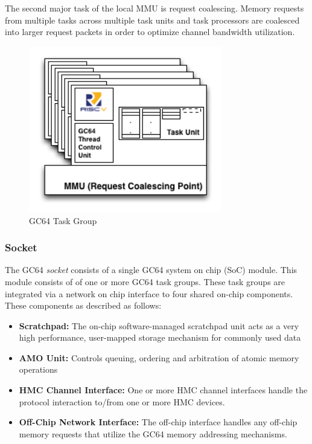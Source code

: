 \documentclass{article}
\begin{document}
The second major task of the local MMU is request coalescing.  Memory requests from 
multiple tasks across multiple task units and task processors are coalesced into larger 
request packets in order to optimize channel bandwidth utilization.  

\begin{figure}[h!]
\begin{center}
\includegraphics[width=0.75\textwidth]{gc64-task-group.png}
\caption{GC64 Task Group}
\end{center}
\label{figure:taskgroup}
\end{figure}  

\newpage
\subsubsection{Socket}

The GC64 \emph{socket} consists of a single GC64 system on chip (SoC) module.  This module 
consists of of one or more GC64 task groups.  These task groups are integrated via a network on 
chip interface to four shared on-chip components.  These components as described as follows: 

\begin{itemize}
\item \textbf{Scratchpad:} The on-chip software-managed scratchpad unit acts as a very high performance, 
user-mapped storage mechanism for commonly used data
\item \textbf{AMO Unit:} Controls queuing, ordering and arbitration of atomic memory operations
\item \textbf{HMC Channel Interface:} One or more HMC channel interfaces handle the protocol interaction to/from one or more HMC devices.  
\item \textbf{Off-Chip Network Interface:} The off-chip interface handles any off-chip memory requests that utilize the GC64 memory addressing mechanisms.  
\end{itemize}
\end{document}
